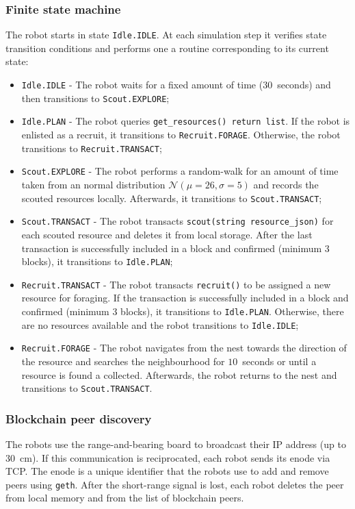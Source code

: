 \documentclass[runningheads]{llncs}
\newcommand{\rab}{range-and-bearing\xspace}
\begin{document}
\subsubsection{Finite state machine}
\label{sec:finite-state-machine} The robot starts in state \texttt{Idle.IDLE}. At each simulation step it verifies state transition conditions and performs one a routine corresponding to its current state:
\begin{itemize}
\item \texttt{Idle.IDLE} - The robot waits for a fixed amount of time ($30$~seconds) and then transitions to \texttt{Scout.EXPLORE};
\item \texttt{Idle.PLAN} - The robot queries \texttt{get\_resources() return list}. If the robot is enlisted as a recruit, it transitions to \texttt{Recruit.FORAGE}. Otherwise, the robot transitions to \texttt{Recruit.TRANSACT};
\item \texttt{Scout.EXPLORE} - The robot performs a random-walk for an amount of time taken from an normal distribution $\mathcal{N}(\mu=26,\sigma=5)$ and records the scouted resources locally. Afterwards, it transitions to \texttt{Scout.TRANSACT};
\item \texttt{Scout.TRANSACT} - The robot transacts \texttt{scout(string resource\_json)} for each scouted resource and deletes it from local storage. After the last transaction is successfully included in a block and confirmed (minimum 3 blocks), it transitions to \texttt{Idle.PLAN};
\item \texttt{Recruit.TRANSACT} - The robot transacts \texttt{recruit()} to be assigned a new resource for foraging. If the transaction is successfully included in a block and confirmed (minimum 3 blocks), it transitions to \texttt{Idle.PLAN}. Otherwise, there are no resources available and the robot transitions to \texttt{Idle.IDLE};
\item \texttt{Recruit.FORAGE} - The robot navigates from the nest towards the direction of the resource and searches the neighbourhood for $10$~seconds or until a resource is found a collected. Afterwards, the robot returns to the nest and transitions to \texttt{Scout.TRANSACT}.
\end{itemize}

\vspace{-5mm}
\subsubsection{Blockchain peer discovery}
\label{sec:peer-discovery}
The robots use the \rab board to broadcast their IP address (up to $30$~cm). If this communication is reciprocated, each robot sends its enode via TCP. The enode is a unique identifier that the robots use to add and remove peers using \texttt{geth}. After the short-range signal is lost, each robot deletes the peer from local memory and from the list of blockchain peers. 
\end{document}
